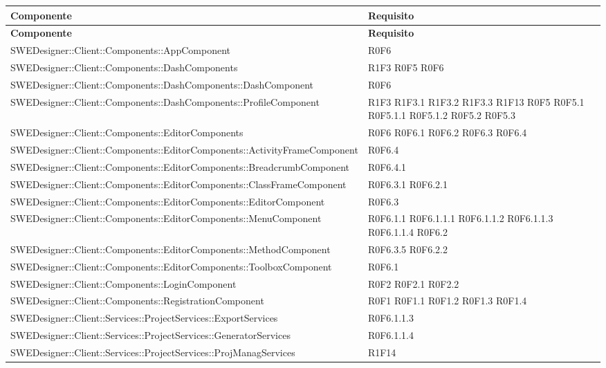 \begin{center}


\begin{longtable}{p{14cm}!{\VRule[1pt]}p{2cm}}
\color{white} \textbf{Componente} & \color{white} \textbf{Requisito}\\ 
\endfirsthead 
{} 
\color{white} \textbf{Componente} & \color{white} \textbf{Requisito}\\  
\endhead 

SWEDesigner::Client::Components::AppComponent & R0F6 \\
SWEDesigner::Client::Components::DashComponents & R1F3 R0F5 R0F6 \\
SWEDesigner::Client::Components::DashComponents::DashComponent & R0F6 \\
SWEDesigner::Client::Components::DashComponents::ProfileComponent & R1F3 R1F3.1 R1F3.2 R1F3.3 R1F13 R0F5 R0F5.1 R0F5.1.1 R0F5.1.2 R0F5.2 R0F5.3  \\
SWEDesigner::Client::Components::EditorComponents & R0F6 R0F6.1 R0F6.2 R0F6.3 R0F6.4 \\
SWEDesigner::Client::Components::EditorComponents::ActivityFrameComponent & R0F6.4 \\
SWEDesigner::Client::Components::EditorComponents::BreadcrumbComponent & R0F6.4.1 \\
SWEDesigner::Client::Components::EditorComponents::ClassFrameComponent & R0F6.3.1 R0F6.2.1 \\
SWEDesigner::Client::Components::EditorComponents::EditorComponent & R0F6.3 \\
SWEDesigner::Client::Components::EditorComponents::MenuComponent & R0F6.1.1 R0F6.1.1.1 R0F6.1.1.2 R0F6.1.1.3 R0F6.1.1.4 R0F6.2 \\
SWEDesigner::Client::Components::EditorComponents::MethodComponent & R0F6.3.5 R0F6.2.2 \\
SWEDesigner::Client::Components::EditorComponents::ToolboxComponent & R0F6.1 \\
SWEDesigner::Client::Components::LoginComponent & R0F2 R0F2.1 R0F2.2 \\
SWEDesigner::Client::Components::RegistrationComponent & R0F1 R0F1.1 R0F1.2 R0F1.3 R0F1.4 \\
SWEDesigner::Client::Services::ProjectServices::ExportServices & R0F6.1.1.3 \\
SWEDesigner::Client::Services::ProjectServices::GeneratorServices & R0F6.1.1.4 \\
SWEDesigner::Client::Services::ProjectServices::ProjManagServices & R1F14 \\

\end{longtable}
\end{center}
